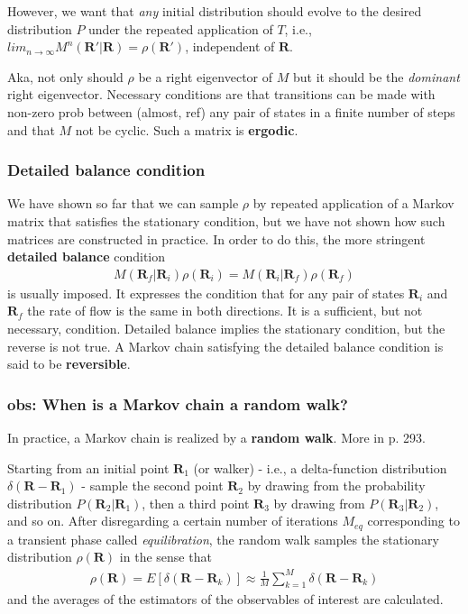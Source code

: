 \documentclass[twoside,english]{uiofysmaster}
\begin{document}
However, we want that \textit{any} initial distribution should evolve to the desired distribution $P$ under the repeated application of $T$, i.e., $lim_{n\rightarrow \infty} M^n (\bm{R}' | \bm{R}) = \rho(\bm{R}')$, independent of $\bm{R}$. 

Aka, not only should $\rho$ be a right eigenvector of $M$ but it should be the \textit{dominant} right eigenvector. Necessary conditions are that transitions can be made with non-zero prob between (almost, ref) any pair of states in a finite number of steps and that $M$ not be cyclic. Such a matrix is \textbf{ergodic}. 
\cite{Umrigar1999}

\subsubsection{Detailed balance condition}
We have shown so far that we can sample $\rho$ by repeated application of a Markov matrix that satisfies the stationary condition, but we have not shown how such matrices are constructed in practice. In order to do this, the more stringent \textbf{detailed balance} condition
\begin{align}
	M(\bm{R}_f | \bm{R}_i ) \rho(\bm{R}_i) = M(\bm{R}_i | \bm{R}_f ) \rho(\bm{R}_f)
\end{align}
is usually imposed. 
It expresses the condition that for any pair of states $\bm{R}_i$ and $\bm{R}_f$ the rate of flow is the same in both directions. It is a sufficient, but not necessary, condition. Detailed balance implies the stationary condition, but the reverse is not true.
\cite{Umrigar1999}
A Markov chain satisfying the detailed balance condition is said to be \textbf{reversible}.\cite{Toulouse2016} 

\subsubsection{obs: When is a Markov chain a random walk?}
In practice, a Markov chain is realized by a \textbf{random walk}. More in \cite{Toulouse2016} p. 293.

Starting from an initial point $\bm{R}_1$ (or walker) - i.e., a delta-function distribution $\delta (\bm{R} - \bm{R}_1)$ - sample the second point $\bm{R}_2$ by drawing from the probability distribution $P(\bm{R}_2|\bm{R}_1)$, then a third point $\bm{R}_3$ by drawing from $P(\bm{R}_3 | \bm{R}_2)$, and so on. After disregarding a certain number of iterations $M_{eq}$ corresponding to a transient phase called \textit{equilibration}, the random walk samples the stationary distribution $\rho(\bm{R})$ in the sense that
\begin{align}
	\rho(\bm{R}) = E[\delta (\bm{R} - \bm{R}_k) ] \approx \frac{1}{M} \sum_{k=1}^M \delta (\bm{R} - \bm{R}_k)
\end{align}
and the averages of the estimators of the observables of interest are calculated.
\end{document}
